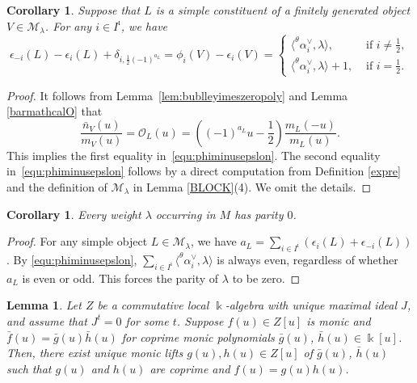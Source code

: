 \documentclass[a4,10pt]{amsart}
\numberwithin{equation}{section}
\newtheorem{Lemma}[Theorem]{Lemma}
\newtheorem{Cor}[Theorem]{Corollary}
\theoremstyle{definition}
\begin{document}
 
\begin{Cor} \label{cor:phievi} 
Suppose that $L$ is a simple constituent of a finitely generated object  $V\in\mathcal M_\lambda$.  %
For any $i\in I^\imath$,   we  have 
\begin{equation}
\label{equ:phiminusepslon} \epsilon_{-i}(L)-\epsilon_i(L)+\delta_{i,\frac{1}{2}(-1)^{a_L}}
  = \phi_i(V)-\epsilon_i(V)= \begin{cases} \langle ^\theta\alpha_i^\vee,\lambda \rangle, & \text{ if } i\neq  \frac{1}{2},\\
    \langle ^\theta\alpha_i^\vee,\lambda \rangle+1, & \text{ if } i=  \frac{1}{2}.
     \end{cases}
\end{equation}
    \end{Cor}
\begin{proof} It follows from Lemma~\ref{lem:bublleyimeszeropoly} and 
 Lemma \ref{barmathcalO} that\begin{equation}\label{eat}
    \frac{\bar n_{V}(u)}{m_V(u)}= \mathcal O_L(u) =  ((-1)^{a_L}u-\frac{1}{2}) \frac{m_L(-u)}{m_L(u)}.  
 \end{equation}   
This implies  the first equality  in~\eqref{equ:phiminusepslon}. The second equality in~\eqref{equ:phiminusepslon}  follows by a direct  computation  from Definition \ref{expre} and the definition of    $\mathcal M_\lambda$  in Lemma \ref{BLOCK}(4). We omit the details. 
 \end{proof}

 \begin{Cor}
 \label{cor:even}
 Every weight $\lambda$ occurring in  $ M$  has  parity $0$. 
 \end{Cor}
 \begin{proof} For any  simple object  $L\in \mathcal M_\lambda$,  we have 
  $a_L=\sum _{i\in I^\imath}(\epsilon_i(L)+\epsilon_{-i}(L))$. By \eqref{equ:phiminusepslon}, $\sum_{i\in I^\imath} \langle ^\theta\alpha_i^\vee,\lambda \rangle$ is always even, regardless of  whether $a_L$ is even or odd. This forces  the parity of $\lambda$ to be zero. \end{proof}
  
\begin{Lemma}
\label{lem:moniclift}
    \cite[Corollary 2.3]{BSW-heisenberg} Let $Z$ be a  commutative local $\Bbbk$-algebra with unique maximal ideal $J$, and assume that $J^t=0$ for some $t$.  Suppose $f(u)\in Z[u]$ is monic and $\bar f(u)=\bar g(u)\bar h(u)$ for  coprime monic polynomials $\bar g(u)$, $\bar h(u)\in \Bbbk[u]$. Then, there exist unique monic lifts  $ g(u), h(u)\in Z[u]$ of $\bar g(u)$, $\bar h(u)$ such that $g(u)$ and $h(u)$ are coprime and  $f(u)=g(u)h(u)$. 
\end{Lemma}
\end{document}
